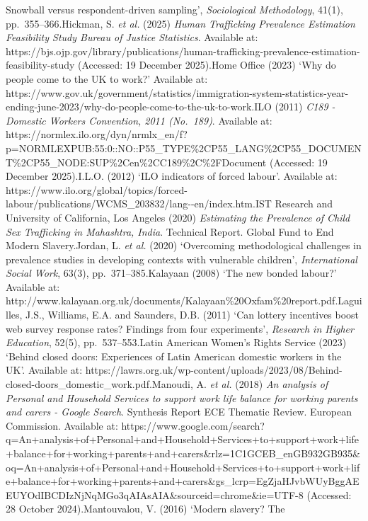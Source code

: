 \documentclass[
  12pt,
  letterpaper,
  DIV=11,
  numbers=noendperiod]{scrartcl}
\begin{document}
{{Snowball versus respondent-driven sampling', \emph{Sociological
Methodology}, 41(1), pp.~355--366.Hickman, S. \emph{et al.} (2025)
\emph{Human Trafficking Prevalence Estimation Feasibility Study
\textbar{} Bureau of Justice Statistics}. Available at:
https://bjs.ojp.gov/library/publications/human-trafficking-prevalence-estimation-feasibility-study
(Accessed: 19 December 2025).Home Office (2023) `Why do people come to
the UK to work?' Available at:
https://www.gov.uk/government/statistics/immigration-system-statistics-year-ending-june-2023/why-do-people-come-to-the-uk-to-work.ILO
(2011) \emph{C189 - Domestic Workers Convention, 2011 (No.~189)}.
Available at:
https://normlex.ilo.org/dyn/nrmlx\_en/f?p=NORMLEXPUB:55:0::NO::P55\_TYPE\%2CP55\_LANG\%2CP55\_DOCUMENT\%2CP55\_NODE:SUP\%2Cen\%2CC189\%2C\%2FDocument
(Accessed: 19 December 2025).I.L.O. (2012) `ILO indicators of forced
labour'. Available at:
https://www.ilo.org/global/topics/forced-labour/publications/WCMS\_203832/lang-\/-en/index.htm.IST
Research and University of California, Los Angeles (2020)
\emph{Estimating the Prevalence of Child Sex Trafficking in Mahashtra,
India}. Technical Report. Global Fund to End Modern Slavery.Jordan, L.
\emph{et al.} (2020) `Overcoming methodological challenges in prevalence
studies in developing contexts with vulnerable children',
\emph{International Social Work}, 63(3), pp.~371--385.Kalayaan (2008)
`The new bonded labour?' Available at:
http://www.kalayaan.org.uk/documents/Kalayaan\%20Oxfam\%20report.pdf.Laguilles,
J.S., Williams, E.A. and Saunders, D.B. (2011) `Can lottery incentives
boost web survey response rates? Findings from four experiments',
\emph{Research in Higher Education}, 52(5), pp.~537--553.Latin American
Women's Rights Service (2023) `Behind closed doors: Experiences of Latin
American domestic workers in the UK'. Available at:
https://lawrs.org.uk/wp-content/uploads/2023/08/Behind-closed-doors\_domestic\_work.pdf.Manoudi,
A. \emph{et al.} (2018) \emph{An analysis of Personal and Household
Services to support work life balance for working parents and carers -
Google Search}. Synthesis Report ECE Thematic Review. European
Commission. Available at:
https://www.google.com/search?q=An+analysis+of+Personal+and+Household+Services+to+support+work+life+balance+for+working+parents+and+carers\&rlz=1C1GCEB\_enGB932GB935\&oq=An+analysis+of+Personal+and+Household+Services+to+support+work+life+balance+for+working+parents+and+carers\&gs\_lcrp=EgZjaHJvbWUyBggAEEUYOdIBCDIzNjNqMGo3qAIAsAIA\&sourceid=chrome\&ie=UTF-8
(Accessed: 28 October 2024).Mantouvalou, V. (2016) `Modern slavery? The
}}
\end{document}
